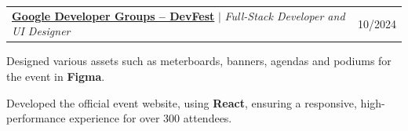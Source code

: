 \documentclass[a4paper, 11pt]{article}
\makeatletter
\newcommand{\resumeProjectHeading}[2]{
  \item
  \begin{tabular*}{1.0\textwidth}[t]{l@{\extracolsep{\fill}}r}
    #1 & #2
  \end{tabular*}
}
\makeatother
\begin{document}
\begin{outerlist}
    \resumeProjectHeading
      {\textbf{\href{https://gdggoa.com/}{Google Developer Groups -- DevFest}} $|$ \emph{Full-Stack Developer and UI Designer}}{10/2024}
    \begin{innerlist}
      \item Designed various assets such as meterboards, banners, agendas and podiums for the event in \textbf{Figma}.
      \item Developed the official event website, using \textbf{React}, ensuring a responsive, high-performance experience for over 300 attendees.
    \end{innerlist}


      
\end{outerlist} 

\end{document}
